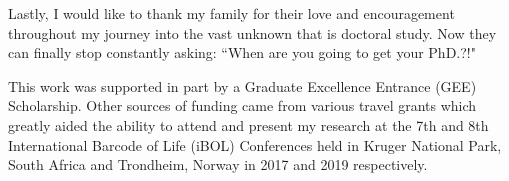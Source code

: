 \begin{acknowledgements}
\noindent Lastly, I would like to thank my family for their love and encouragement throughout my journey into the vast unknown that is doctoral study. Now they can finally stop constantly asking: ``When are you going to get your PhD.?!"

\vspace{5mm}

\noindent This work was supported in part by a Graduate Excellence Entrance (GEE) \\ Scholarship. Other sources of funding came from various travel grants which greatly aided the ability to attend and present my research at the 7th and 8th International Barcode of Life (iBOL) Conferences held in Kruger National Park, South Africa and Trondheim, Norway in 2017 and 2019 respectively.


\end{acknowledgements}
\dsp
